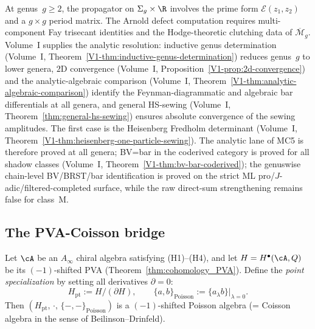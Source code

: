 \begin{remark}
\label{rem:mc5-higher-genus-open}
At genus~$g \geq 2$, the propagator on $\Sigma_g \times \R$ involves
the prime form $\mathcal{E}(z_1, z_2)$ and a $g \times g$ period
matrix. The Arnold defect computation requires multi-component
Fay trisecant identities and the Hodge-theoretic clutching data of
$\overline{\mathcal{M}}_g$. Volume~I supplies the analytic resolution:
inductive genus determination
(Volume~I, Theorem~\ref*{V1-thm:inductive-genus-determination})
reduces genus~$g$ to lower genera, $2$D convergence
(Volume~I, Proposition~\ref*{V1-prop:2d-convergence}) and
the analytic-algebraic comparison
(Volume~I, Theorem~\ref*{V1-thm:analytic-algebraic-comparison})
identify the Feynman-diagrammatic and algebraic bar differentials
at all genera, and general HS-sewing
(Volume~I, Theorem~\ref*{thm:general-hs-sewing}) ensures
absolute convergence of the sewing amplitudes. The first
case is the Heisenberg Fredholm determinant
(Volume~I, Theorem~\ref*{V1-thm:heisenberg-one-particle-sewing}).
The analytic lane of MC5 is therefore proved at all genera; BV=bar in the coderived category is proved for all shadow classes (Volume~I, Theorem~\ref*{V1-thm:bv-bar-coderived}); the genuswise chain-level BV/BRST/bar identification is proved on the strict ML pro/$J$-adic/filtered-completed surface, while the raw direct-sum strengthening remains false for class~M.
\end{remark}

\subsection{The PVA-Coisson bridge}

\begin{theorem}[PVA descent at $X = \mathrm{pt}$ recovers Coisson
structure; \ClaimStatusProvedHere]
Let $\cA$ be an $A_\infty$ chiral algebra satisfying
\textrm{(H1)--(H4)}, and let $H = H^\bullet(\cA, Q)$ be its
$(-1)$-shifted PVA (Theorem~\textup{\ref{thm:cohomology_PVA}}).
Define the \emph{point specialization} by setting all derivatives
$\partial = 0$:
\[
H_{\mathrm{pt}}
:= H / (\partial H),
\qquad
\{a, b\}_{\mathrm{Poisson}} := \{a {}_\lambda b\}|_{\lambda = 0}.
\]
Then $(H_{\mathrm{pt}},\, \cdot,\, \{-,-\}_{\mathrm{Poisson}})$
is a $(-1)$-shifted Poisson algebra \textup(= Coisson algebra in
the sense of Beilinson--Drinfeld\textup).
\end{theorem}

